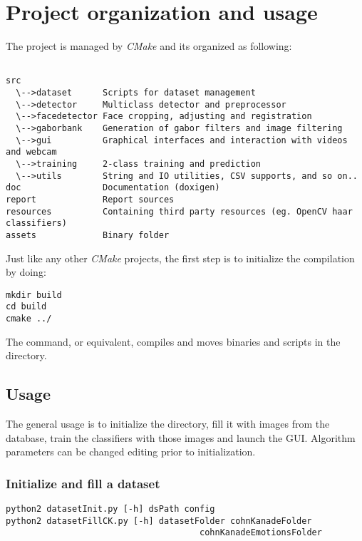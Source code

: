 \section{Project organization and usage}

The project is managed by \emph{CMake} and its organized as following:

\begin{verbatim}

src
  \-->dataset      Scripts for dataset management
  \-->detector     Multiclass detector and preprocessor
  \-->facedetector Face cropping, adjusting and registration
  \-->gaborbank    Generation of gabor filters and image filtering
  \-->gui          Graphical interfaces and interaction with videos and webcam
  \-->training     2-class training and prediction
  \-->utils        String and IO utilities, CSV supports, and so on..
doc                Documentation (doxigen)
report             Report sources
resources          Containing third party resources (eg. OpenCV haar classifiers)
assets             Binary folder

\end{verbatim}

Just like any other \emph{CMake} projects, the first step is to initialize the
compilation by doing:

\begin{verbatim}
mkdir build
cd build
cmake ../
\end{verbatim}

The  command, or equivalent, compiles and moves binaries and
scripts in the  directory.

\subsection{Usage}

The general usage is to initialize the  directory, fill it with
images from the  database, train the classifiers with those images and
launch the GUI. Algorithm parameters can be changed editing
 prior to initialization.

\subsubsection*{Initialize and fill a dataset}

\begin{verbatim}
python2 datasetInit.py [-h] dsPath config
python2 datasetFillCK.py [-h] datasetFolder cohnKanadeFolder
                                      cohnKanadeEmotionsFolder
\end{verbatim}

